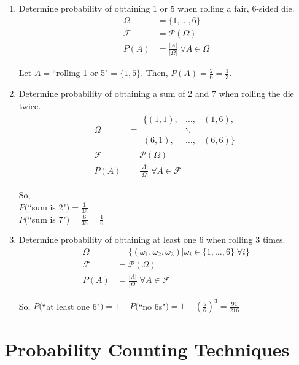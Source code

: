 \documentclass{article}
\begin{document}
	\begin{myex}{}{}
		\begin{enumerate}
			\item Determine probability of obtaining 1 or 5 when rolling a fair, 6-sided die.
			\begin{align*}
				\Omega&=\{1, \dots, 6\}\\
				\mathcal{F}&=\mathcal{P}(\Omega)\\
				P(A)&=\frac{|A|}{|\Omega|}\;\forall A\in\Omega
			\end{align*}
			
			Let $A=$``rolling 1 or 5"$=\{1, 5\}$. Then, $P(A)=\frac{2}{6}=\frac{1}{3}$.
			\item Determine probability of obtaining a sum of 2 and 7 when rolling the die twice.
			\begin{align*}
				\Omega&=\begin{matrix}
				\{(1, 1), & \dots, & (1, 6),\\
				& \ddots & \\
				(6, 1), & \dots, & (6, 6)\}
				\end{matrix}\\
				\mathcal{F}&=\mathcal{P}(\Omega)\\
				P(A)&=\frac{|A|}{|\Omega|}\;\forall A\in\mathcal{F}
			\end{align*}
			
			So,\\
			
			$P($``sum is 2"$)=\frac{1}{36}$\\
			
			$P($``sum is 7"$)=\frac{6}{36}=\frac{1}{6}$\\
			\item Determine probability of obtaining at least one 6 when rolling 3 times.
			\begin{align*}
				\Omega&=\{(\omega_1, \omega_2, \omega_3) | \omega_i\in\{1, \dots, 6\}\;\forall i\}\\
				\mathcal{F}&=\mathcal{P}(\Omega)\\
				P(A)&=\frac{|A|}{|\Omega|}\;\forall A\in\mathcal{F}
			\end{align*}
			
			So, $P($``at least one 6"$)=1-P($``no 6s"$)=1-(\frac{5}{6})^3=\frac{91}{216}$
		\end{enumerate}
	\end{myex}
	
	\newpage
	\section{Probability Counting Techniques}
\end{document}
